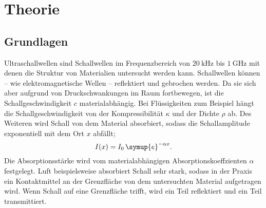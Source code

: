 \section{Theorie}
\label{sec:Theorie}

\subsection{Grundlagen}
Ultraschallwellen sind Schallwellen im Frequenzbereich von $\SI{20}{\kilo\hertz}$ bis
$\SI{1}{\giga\hertz}$ mit denen die Struktur von Materialien untersucht werden kann.
Schallwellen können -- wie elektromagnetische Wellen -- reflektiert und gebrochen werden.
Da sie sich aber aufgrund von Druckschwankungen im Raum fortbewegen, ist die
Schallgeschwindigkeit $c$ materialabhängig. Bei Flüssigkeiten zum Beispiel hängt die
Schallgeschwindigkeit von der Kompressibilität $\kappa$ und der Dichte $\rho$ ab.
Des Weiteren wird Schall von dem Material absorbiert, sodass die Schallamplitude exponentiell
mit dem Ort $x$ abfällt;
\begin{equation}
	\label{eqn:dampf}
	I(x) = I_0 \, \symup{e}^{-\alpha x} \mathrm{.}
\end{equation}
Die Absorptionsstärke wird vom materialabhängigen Absorptionskoeffzienten $\alpha$ festgelegt.
Luft beispielsweise absorbiert Schall sehr stark, sodass in der Praxis ein Kontaktmittel an der
Grenzfläche von dem untersuchten Material aufgetragen wird.
Wenn Schall auf eine Grenzfläche trifft, wird ein Teil reflektiert
und ein Teil transmittiert.

